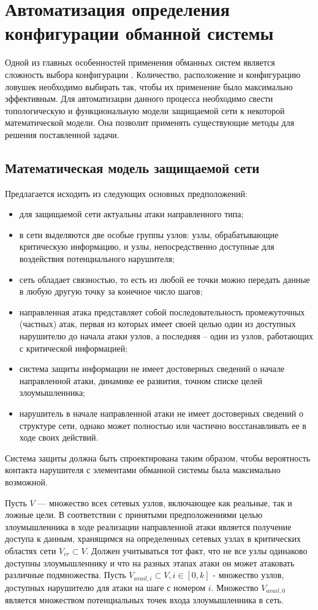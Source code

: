 \section{Автоматизация определения конфигурации обманной системы}

Одной из главных особенностей применения обманных систем является сложность выбора конфигурации \citep{rajan}. Количество, расположение и конфигурацию ловушек необходимо выбирать так, чтобы их применение было максимально эффективным. Для автоматизации данного процесса необходимо свести топологическую и функциональную модели защищаемой сети к некоторой математической модели. Она позволит применять существующие методы для решения поставленной задачи.

\subsection{Математическая модель защищаемой сети}

Предлагается исходить из следующих основных предположений:
\begin{itemize}
	\item для защищаемой сети актуальны атаки направленного типа;
	\item в сети выделяются две особые группы узлов: узлы, обрабатывающие критическую информацию, и узлы, непосредственно доступные для воздействия потенциального нарушителя;
	\item сеть обладает связностью, то есть из любой ее точки можно передать данные в любую другую точку за конечное число шагов;
	\item направленная атака представляет собой последовательность промежуточных (частных) атак, первая из которых имеет своей целью один из доступных нарушителю до начала атаки узлов, а последняя – один из узлов, работающих с критической информацией;
	\item система защиты информации не имеет достоверных сведений о начале направленной атаки, динамике ее развития, точном списке целей злоумышленника;
	\item нарушитель в начале направленной атаки не имеет достоверных сведений о структуре сети, однако может полностью или частично восстанавливать ее в ходе своих действий.
\end{itemize}

Система защиты должна быть спроектирована таким образом, чтобы вероятность контакта нарушителя с элементами обманной системы была максимально возможной.

Пусть $V$ — множество всех сетевых узлов, включающее как реальные, так и ложные цели. В соответствии с принятыми предположениями целью злоумышленника в ходе реализации направленной атаки является получение доступа к данным, хранящимся на определенных сетевых узлах в критических областях сети $V_{cr} \subset V$. Должен учитываться тот факт, что не все узлы одинаково доступны злоумышленнику и что на разных этапах атаки он может атаковать различные подмножества. Пусть $V_{avail,i} \subset V, i \in [0, k]$ - множество узлов, доступных нарушителю для атаки на шаге с номером $i$. Множество $V_{avail,0}$ является множеством потенциальных точек входа злоумышленника в сеть.

